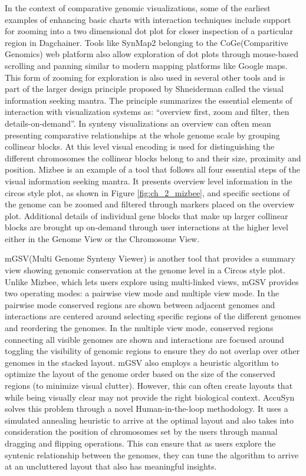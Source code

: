 In the context of comparative genomic visualizations, some of the earliest examples of enhancing basic charts with interaction techniques include support for zooming into a two dimensional dot plot for closer inspection of a particular region in Dagchainer\cite{haas2004dagchainer}. Tools like SynMap2\cite{haug2017synmap2} belonging to the CoGe(Comparitive Genomics)\cite{coge} web platform also allow exploration of dot plots through mouse-based scrolling and panning similar to modern mapping platforms like Google maps. This form of zooming for exploration is also used in several other tools and is part of the larger design principle proposed by Shneiderman\cite{Shneiderman96theeyes} called the visual information seeking mantra. The principle summarizes the essential elements of interaction with visualization systems as: ``overview first, zoom and filter, then details-on-demand''. In synteny visualizations an overview can often mean presenting comparative relationships at the whole genome scale by grouping collinear blocks. At this level visual encoding is used for distinguishing the different chromosomes the collinear blocks belong to and their size, proximity and position. Mizbee is an example of a tool that follows all four essential steps of the visual information seeking mantra\cite{Meyer2009}. It presents overview level information in the circos style plot, as shown in Figure \ref{fig:ch_2_mizbee}, and specific sections of the genome can be zoomed and filtered through markers placed on the overview plot. Additional details of individual gene blocks that make up larger collinear blocks are brought up on-demand through user interactions at the higher level either in the Genome View or the  Chromosome View. 

mGSV(Multi Genome Synteny Viewer) is another tool that provides a summary view showing genomic conservation at the genome level in a Circos style plot\cite{revanna2011gsv}. Unlike Mizbee, which lets users explore using multi-linked views, mGSV provides two operating modes: a pairwise view mode and multiple view mode. In the pairwise mode conserved regions are shown between adjacent genomes and interactions are centered around selecting specific regions of the different genomes and reordering the genomes. In the multiple view mode, conserved regions connecting all visible genomes are shown and interactions are focused around toggling the visibility of genomic regions to ensure they do not overlap over other genomes in the stacked layout. mGSV also employs a heuristic algorithm to optimize the layout of the genome order based on the size of the conserved regions (to minimize visual clutter). However, this 
can often create layouts that while being visually clear may not provide the right biological context. AccuSyn solves this problem through a novel Human-in-the-loop methodology\cite{accusyn}. It uses a simulated annealing heuristic to arrive at the optimal layout and also takes into consideration the position of chromosomes set by the users through manual dragging and flipping operations. This can ensure that as users explore the syntenic relationship between the genomes, they can tune the algorithm to arrive at an uncluttered layout that also has meaningful insights.

